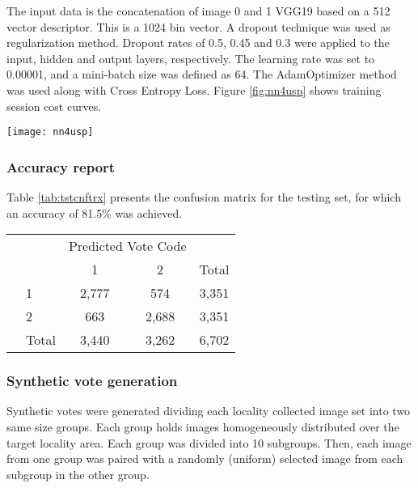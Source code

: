 \documentclass{llncs}
\begin{document}
The input data is the concatenation of image 0 and 1 VGG19 based on a 512 vector descriptor. This is a 1024 bin vector. A dropout technique was used as regularization method. Dropout rates of 0.5, 0.45 and 0.3 were applied to the input, hidden and output layers, respectively. The learning rate was set to 0.00001, and a mini-batch size was defined as 64. The AdamOptimizer \cite{DBLP:journals/corr/KingmaB14} method was used along with Cross Entropy Loss. Figure \ref{fig:nn4usp} shows training session cost curves.

\begin{center}
	\centering
	\texttt{[image: nn4usp]}
	\label{fig:nn4usp}
\end{center}

\subsubsection{Accuracy report}
Table \ref{tab:tstcnftrx} presents the confusion matrix for the testing set, for which an accuracy of 81.5\% was achieved.


\begin{center}
	 \label{tab:tstcnftrx} 
	\begin{tabular}{l|l|c|c|c}
		\multicolumn{2}{c}{}&\multicolumn{2}{c}{Predicted Vote Code}&\\
		\cline{3-4}
		\multicolumn{2}{c|}{}&1&2&\multicolumn{1}{c}{Total}\\
		\cline{2-4}
		& 1 & 2,777 & 574& 3,351\\
		\cline{2-4}
		& 2 & 663 & 2,688 & 3,351\\
		\cline{2-4}
		\multicolumn{1}{c}{} & \multicolumn{1}{c}{Total} & \multicolumn{1}{c}{3,440} & \multicolumn{    1}{c}{3,262} & \multicolumn{1}{c}{6,702}\\
	\end{tabular}
	
\end{center}


\subsubsection{Synthetic vote generation}
Synthetic votes were generated dividing each locality collected image set into two same size groups. Each group holds images homogeneously distributed over the target locality area. Each group was divided into 10 subgroups. Then, each image from one group was paired with a randomly (uniform) selected image from each subgroup in the other group.
\end{document}
